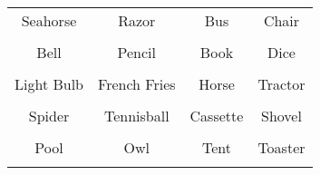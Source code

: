 \documentclass[12pt,a4paper]{article}
\begin{document}
\thispagestyle{empty}
\begin{table}[]
\centering
\Huge
\begin{tabular}{cccc}
 Seahorse& Razor& Bus& Chair\\  & & & \\
 Bell& Pencil& Book& Dice\\  & & & \\
 Light Bulb& French Fries& Horse& Tractor\\  & & & \\
 Spider& Tennisball& Cassette& Shovel\\  & & & \\
 Pool& Owl& Tent& Toaster\\  & & & \\
\end{tabular}
\end{table}
\end{document}
